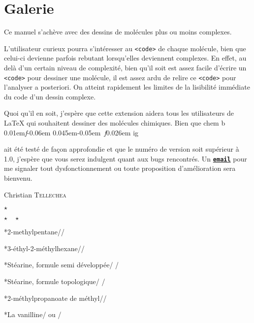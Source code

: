 \documentclass[10pt,french]{article}
\makeatletter
\newcommand\make@car@active[1]{%
	\catcode`#1\active
	\begingroup
		\lccode`\~`#1\relax
		\lowercase{\endgroup\def~}%
}
\newif\if@exstar
\newcommand\exemple{%
	\begingroup
	\parskip\z@
	\@makeother\;\@makeother\!\@makeother\?\@makeother\:%
	\@ifstar{\@exstartrue\exemple@}{\@exstarfalse\exemple@}}
\newcommand\exemple@[2][65]{%
	\medbreak\noindent
	\begingroup
		\let\do\@makeother\dospecials
		\make@car@active\ { {}}%
		\make@car@active\^^M{\par\leavevmode}%
		\make@car@active\^^I{\space\space}%
		\make@car@active\,{\leavevmode\kern\z@\string,}%
		\make@car@active\-{\leavevmode\kern\z@\string-}%
		\make@car@active\>{\leavevmode\kern\z@\string>}%
		\make@car@active\<{\leavevmode\kern\z@\string<}%
		\exemple@@{#1}{#2}%
}
\newcommand\exemple@@[3]{%
	\def\@tempa##1#3{\exemple@@@{#1}{#2}{##1}}%
	\@tempa
}
\newcommand\exemple@@@[3]{%
	\xdef\the@code{#3}%
	\endgroup
	\if@exstar
		\begingroup
			\fboxrule0.4pt
			\let\breakboxparindent\z@
			\def\bkvz@bottom{\hrule\@height\fboxrule}%
			\let\bkvz@before@breakbox\relax
			\def\bkvz@set@linewidth{\advance\linewidth\dimexpr-2\fboxrule-2\fboxsep}%
			\def\bkvz@left{\vrule\@width\fboxrule\hskip\fboxsep}%
			\def\bkvz@right{\hskip\fboxsep\vrule\@width\fboxrule}%
			\def\bkvz@top{\hbox to \hsize{%
				\vrule\@width\fboxrule\@height\fboxrule
				\leaders\bkvz@bottom\hfill
				\sffamily
				\fboxsep\z@
				\colorbox{black}{\kern0.25em\color{white}\footnotesize\lower0.5ex\hbox{\strut#2}\kern0.25em}%
				\leaders\bkvz@bottom\hfill
				\vrule\@width\fboxrule\@height\fboxrule}}%
			\breakbox
				\kern.5ex\relax
				\ttfamily\footnotesize\the@code\par
				\normalfont
				\kern3pt
				\hrule height0.1pt width\linewidth depth0.1pt
				\vskip5pt
				\rightskip0pt plus 1fill
				\everypar{{\color{lightgray}\rlap{\vrule height0.1pt width\linewidth depth0.1pt}}\hskip0pt plus 1fill}%
				\newlinechar`\^^M\everyeof{\noexpand}\scantokens{#3}\par
			\endbreakbox
		\endgroup
	\else
		\vskip0.5ex
		\boxput*(0,1)
			{\fboxsep\z@
			\hbox{\sffamily\colorbox{black}{\leavevmode\kern0.25em{\color{white}\footnotesize\strut#2}\kern0.25em}}%
			}%
			{\fboxsep5pt
			\fbox{%
				$\vcenter{\hsize\dimexpr0.#1\linewidth-\fboxsep-\fboxrule\relax
					\kern5pt\parskip0pt \ttfamily\footnotesize\the@code}%
				\vcenter{\kern5pt\hsize\dimexpr\linewidth-0.#1\linewidth-\fboxsep-\fboxrule\relax
					\everypar{{\color{lightgray}\rlap{\vrule height0.1pt width\dimexpr\linewidth-0.#1\linewidth-\fboxsep-\fboxrule depth0.1pt}}}%
					\footnotesize\newlinechar`\^^M\everyeof{\noexpand}\scantokens{#3}}$%
				}%
			}%
	\fi
	\medbreak
	\endgroup
}
\let\do\@makeother\dospecials
\DeclareRobustCommand\CF{%
	\textsf{%
		chem%
		\if\string b\detokenize\expandafter{\f@series}%
			\lower0.01em\hbox{\itshape f}\kern-0.06em
		\else
			\lower0.045em\hbox{\kern-0.05em \itshape f}\kern0.026em
		\fi ig%
		}%
		\xspace
}
\makeatother
\begin{document}
\part{Galerie}
Ce manuel s'achève avec des dessins de molécules plus ou moins complexes.

L'utilisateur curieux pourra s'intéresser au \verb-<code>- de chaque molécule, bien que celui-ci devienne parfois rebutant lorsqu'elles deviennent complexes. En effet, au delà d'un certain niveau de complexité, bien qu'il soit est assez facile d'écrire un \verb-<code>- pour dessiner une molécule, il est assez ardu de relire ce \verb-<code>- pour l'analyser a posteriori. On atteint rapidement les limites de la lisibilité immédiate du code d'un dessin complexe.

Quoi qu'il en soit, j'espère que cette extension aidera tous les utilisateurs de \LaTeX{} qui souhaitent dessiner des molécules chimiques. Bien que \CF ait été testé de façon approfondie et que le numéro de version soit supérieur à 1.0, j'espère que vous serez indulgent quant aux bugs rencontrés. Un \href{mailto:unbonpetit@netc.fr}{\texttt{\textbf{email}}} pour me signaler tout dysfonctionnement ou toute proposition d'amélioration sera bienvenu.\nobreak

\hfill Christian \textsc{Tellechea}
\bigskip

\begin{center}
\parskip0pt
$\star$\par
$\star\quad\star$
\end{center}
\bigskip

\exemple*{2-methylpentane}//

\exemple*{3-éthyl-2-méthylhexane}//

\exemple*{Stéarine, formule semi développée}/
/

\exemple*{Stéarine, formule topologique}/
/

\exemple*{2-méthylpropanoate de méthyl}//

\exemple*{La vanilline}/ \quad ou \quad
{}/
\end{document}
